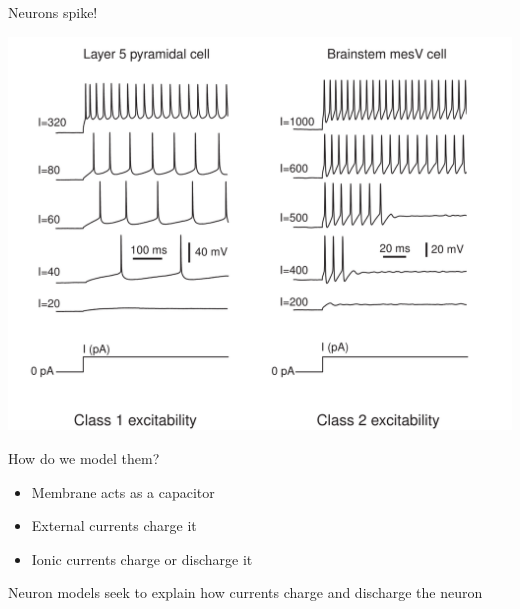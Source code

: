 \documentclass[presentation]{beamer}
\begin{document}
\begin{frame}[label={sec:orgb4b1d42}]{Neurons spike!}
\begin{center}
\includegraphics[height=.8\textheight]{./excitability_classes.png}
\end{center}
\end{frame}

\begin{frame}[label={sec:orgfff7f49}]{How do we model them?}
\begin{itemize}
\item Membrane acts as a capacitor
\item External currents charge it
\item Ionic currents charge or discharge it
\end{itemize}

\vfill
Neuron models seek to explain how currents charge and discharge the neuron
\end{frame}
\end{document}
